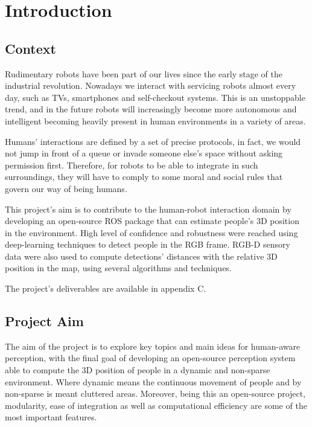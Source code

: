 \chapter{Introduction}
\label{chapter1}

\section{Context}

Rudimentary robots have been part of our lives since the early stage of the industrial revolution. Nowadays we interact with servicing robots almost every day, such as TVs, smartphones and self-checkout systems. This is an unstoppable trend, and in the future robots will increasingly become more autonomous and intelligent becoming heavily present in human environments in a variety of areas.

Humans' interactions are defined by a set of precise protocols, in fact, we would not jump in front of a queue or invade someone else's space without asking permission first. Therefore, for robots to be able to integrate in such surroundings, they will have to comply to some moral and social rules that govern our way of being humans.

This project's aim is to contribute to the human-robot interaction domain by developing an open-source ROS package that can estimate people's 3D position in the environment. High level of confidence and robustness were reached using deep-learning techniques to detect people in the RGB frame. RGB-D sensory data were also used to compute detections' distances with the relative 3D position in the map, using several algorithms and techniques.

The project's deliverables are available in appendix C.

\section{Project Aim}

The aim of the project is to explore key topics and main ideas for human-aware perception, with the final goal of developing an open-source perception system able to compute the 3D position of people in a dynamic and non-sparse environment. Where dynamic means the continuous movement of people and by non-sparse is meant cluttered areas. Moreover, being this an open-source project, modularity, ease of integration as well as computational efficiency are some of the most important features.

